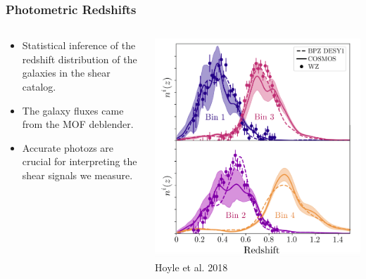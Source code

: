 \documentclass[aspectratio=169]{beamer}
\begin{document}
{\begin{columns}
    \end{columns}

}

\frame
{

    \frametitle{Photometric Redshifts}


    \begin{columns}
        \begin{column}{0.5\textwidth}
            \begin{itemize}

                \item Statistical inference of the redshift distribution
                    of the galaxies in the shear catalog.

                \item The galaxy fluxes came from the MOF deblender.

                \item Accurate photozs are crucial for interpreting
                    the shear signals we measure.

            \end{itemize}

        \end{column}
        \begin{column}{0.5\textwidth}
            \centering
                \includegraphics[width=\linewidth]{dndz-fig4.png}
                \newline
                {\tiny Hoyle et al. 2018}
        \end{column}

    \end{columns}

}
\end{document}
